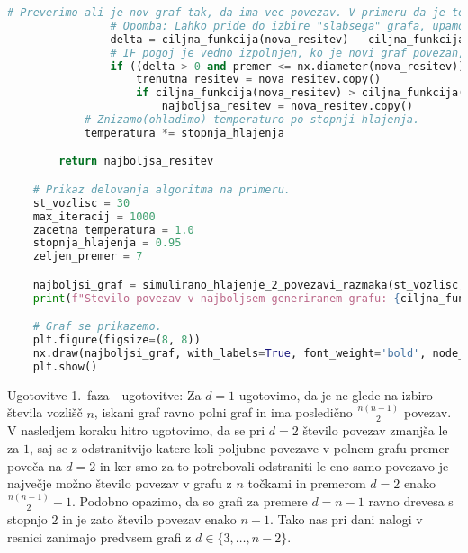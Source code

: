 \documentclass[12pt,a4paper]{amsart}
\makeatletter
\renewcommand\section{\@startsection{section}{1}%
  \z@{.5\linespacing\@plus.7\linespacing}{.5\linespacing}%
  {\normalfont\scshape\large\centering}}
\renewcommand\subsection{\@startsection{subsection}{2}%
  \z@{.5\linespacing\@plus.7\linespacing}{.5\linespacing}%
  {\normalfont\scshape}}
\theoremstyle{definition} %
\theoremstyle{plain} %
\makeatother
\begin{document}
\begin{lstlisting}[language=Python]
                # Preverimo ali je nov graf tak, da ima vec povezav. V primeru da je to res, posodobimo najboljso resitev, sicer pa z verjetnostjo izberemo ali bomo posodobili trenutno resitev ali ne.
                # Opomba: Lahko pride do izbire "slabsega" grafa, upamo, da nas bo ta "slabsi" vseeno pripeljal do boljse resitve v nadaljevanju.
                delta = ciljna_funkcija(nova_resitev) - ciljna_funkcija(trenutna_resitev)
                # IF pogoj je vedno izpolnjen, ko je novi graf povezan, prvi del pogoja pustimo zgolj za voljo testiranja.
                if ((delta > 0 and premer <= nx.diameter(nova_resitev)) or random.random() < math.exp(-delta / temperatura)) and nx.is_connected(nova_resitev):
                    trenutna_resitev = nova_resitev.copy()
                    if ciljna_funkcija(nova_resitev) > ciljna_funkcija(najboljsa_resitev) and premer == nx.diameter(nova_resitev):
                        najboljsa_resitev = nova_resitev.copy()
            # Znizamo(ohladimo) temperaturo po stopnji hlajenja.
            temperatura *= stopnja_hlajenja

        return najboljsa_resitev

    # Prikaz delovanja algoritma na primeru.
    st_vozlisc = 30
    max_iteracij = 1000
    zacetna_temperatura = 1.0
    stopnja_hlajenja = 0.95
    zeljen_premer = 7

    najboljsi_graf = simulirano_hlajenje_2_povezavi_razmaka(st_vozlisc, max_iteracij, zacetna_temperatura, stopnja_hlajenja, zeljen_premer)
    print(f"Stevilo povezav v najboljsem generiranem grafu: {ciljna_funkcija(najboljsi_graf)}")

    # Graf se prikazemo.
    plt.figure(figsize=(8, 8))
    nx.draw(najboljsi_graf, with_labels=True, font_weight='bold', node_color='skyblue', node_size=800, font_size=10)
    plt.show()
\end{lstlisting}

\pagebreak
\section{Ugotovitve}
\subsection{1.\ faza - ugotovitve:}
\noindent Za $d = 1$ ugotovimo, da je ne glede
na izbiro števila vozlišč $n$, iskani graf ravno polni graf in ima posledično
$\frac{n (n - 1)}{2}$ povezav. V nasledjem koraku hitro ugotovimo, da se pri $d = 2$ število
povezav zmanjša le za $1$, saj se z odstranitvijo katere koli poljubne povezave v polnem grafu
premer poveča na $d = 2$ in ker smo za to potrebovali odstraniti le eno samo povezavo je največje
možno število povezav v grafu z $n$ točkami in premerom $d = 2$ enako $\frac{n (n - 1)}{2} - 1$.
Podobno opazimo, da so grafi za premere $d = n - 1$ ravno drevesa s stopnjo $2$ in je zato število
povezav enako $n - 1$. Tako nas pri dani nalogi v resnici zanimajo predvsem grafi z
$d \in \{3, \dots, n - 2\}$.
\end{document}
